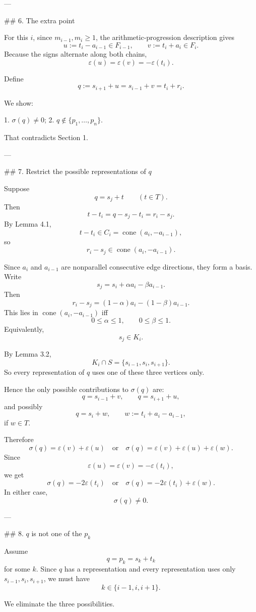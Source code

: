 ---

## 6. The extra point

For this \(i\), since \(m_{i-1},m_i\ge 1\), the arithmetic-progression description gives
\[
u:=t_i-a_{i-1}\in F_{i-1},\qquad
v:=t_i+a_i\in F_i.
\]
Because the signs alternate along both chains,
\[
\varepsilon(u)=\varepsilon(v)=-\varepsilon(t_i).
\]

Define
\[
q:=s_{i+1}+u=s_{i-1}+v=t_i+r_i.
\]

We show:

1. \(\sigma(q)\neq 0\);
2. \(q\notin\{p_1,\dots,p_n\}\).

That contradicts Section 1.

---

## 7. Restrict the possible representations of \(q\)

Suppose
\[
q=s_j+t
\qquad (t\in T).
\]
Then
\[
t-t_i=q-s_j-t_i=r_i-s_j.
\]
By Lemma 4.1,
\[
t-t_i\in C_i=\operatorname{cone}(a_i,-a_{i-1}),
\]
so
\[
r_i-s_j\in \operatorname{cone}(a_i,-a_{i-1}).
\]

Since \(a_i\) and \(a_{i-1}\) are nonparallel consecutive edge directions, they form a basis. Write
\[
s_j=s_i+\alpha a_i-\beta a_{i-1}.
\]
Then
\[
r_i-s_j=(1-\alpha)a_i-(1-\beta)a_{i-1}.
\]
This lies in \(\operatorname{cone}(a_i,-a_{i-1})\) iff
\[
0\le \alpha\le 1,\qquad 0\le \beta\le 1.
\]
Equivalently,
\[
s_j\in K_i.
\]

By Lemma 3.2,
\[
K_i\cap S=\{s_{i-1},s_i,s_{i+1}\}.
\]
So every representation of \(q\) uses one of these three vertices only.

Hence the only possible contributions to \(\sigma(q)\) are:
\[
q=s_{i-1}+v,\qquad q=s_{i+1}+u,
\]
and possibly
\[
q=s_i+w,\qquad w:=t_i+a_i-a_{i-1},
\]
if \(w\in T\).

Therefore
\[
\sigma(q)=\varepsilon(v)+\varepsilon(u)
\quad\text{or}\quad
\sigma(q)=\varepsilon(v)+\varepsilon(u)+\varepsilon(w).
\]
Since
\[
\varepsilon(u)=\varepsilon(v)=-\varepsilon(t_i),
\]
we get
\[
\sigma(q)=-2\varepsilon(t_i)
\quad\text{or}\quad
\sigma(q)=-2\varepsilon(t_i)+\varepsilon(w).
\]
In either case,
\[
\sigma(q)\neq 0.
\]

---

## 8. \(q\) is not one of the \(p_k\)

Assume
\[
q=p_k=s_k+t_k
\]
for some \(k\). Since \(q\) has a representation and every representation uses only \(s_{i-1},s_i,s_{i+1}\), we must have
\[
k\in\{i-1,i,i+1\}.
\]

We eliminate the three possibilities.


